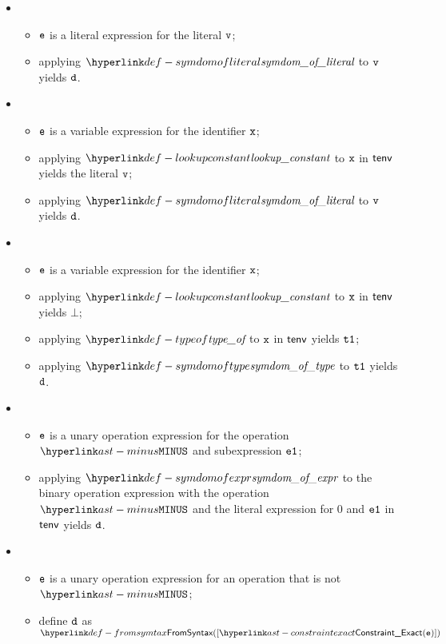 \ProseParagraph
\OneApplies
\begin{itemize}
  \item {}
  \begin{itemize}
    \item $\texttt{e}$ is a literal expression for the literal $\texttt{v}$;
    \item applying $\symdomofliteral$ to $\texttt{v}$ yields $\texttt{d}$.
  \end{itemize}

  \item {}
  \begin{itemize}
    \item $\texttt{e}$ is a variable expression for the identifier $\texttt{x}$;
    \item applying $\lookupconstant$ to $\texttt{x}$ in $\textsf{tenv}$ yields the literal $\texttt{v}$;
    \item applying $\symdomofliteral$ to $\texttt{v}$ yields $\texttt{d}$.
  \end{itemize}

  \item {}
  \begin{itemize}
    \item $\texttt{e}$ is a variable expression for the identifier $\texttt{x}$;
    \item applying $\lookupconstant$ to $\texttt{x}$ in $\textsf{tenv}$ yields $\bot$;
    \item applying $\typeof$ to $\texttt{x}$ in $\textsf{tenv}$ yields $\texttt{t1}$;
    \item applying $\symdomoftype$ to $\texttt{t1}$ yields $\texttt{d}$.
  \end{itemize}

  \item {}
  \begin{itemize}
    \item $\texttt{e}$ is a unary operation expression for the operation $\MINUS$ and subexpression $\texttt{e1}$;
    \item applying $\symdomofexpr$ to the binary operation expression with the operation $\MINUS$
          and the literal expression for $0$ and $\texttt{e1}$ in $\textsf{tenv}$ yields $\texttt{d}$.
  \end{itemize}

  \item {}
  \begin{itemize}
    \item $\texttt{e}$ is a unary operation expression for an operation that is not $\MINUS$;
    \item define $\texttt{d}$ as $\FromSyntax([\ConstraintExact(\ve)])$
  \end{itemize}


\end{itemize}
